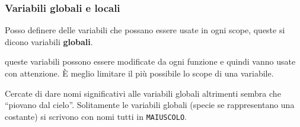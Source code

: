 \begin{frame}[fragile]\frametitle{Variabili globali e locali}

  Posso definere delle variabili che possano essere usate in ogni
  scope, queste si dicono variabili \textbf{globali}.

  \begin{JavaCodePlain}[commandchars=\\!|]
  \Word!public class| GlobaliLocali {
    
    \Jint numero = 0;
    
  \dots
  \end{JavaCodePlain}

  queste variabili possono essere modificate da ogni funzione e quindi
  \alert{vanno usate con attenzione}. È meglio limitare il più possibile
  lo scope di una variabile.
    
  Cercate di dare nomi significativi alle variabili globali altrimenti
  sembra che ``piovano dal cielo''. Solitamente le variabili globali
  (specie se rappresentano una costante) si scrivono con nomi
  tutti in \texttt{MAIUSCOLO}.
  
\end{frame}